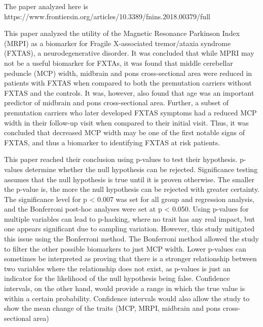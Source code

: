 \documentclass[./ProjectReport.tex]{subfiles}
\begin{document}
\begin{center}
    The paper analyzed here is https://www.frontiersin.org/articles/10.3389/fnins.2018.00379/full    
\end{center}

This paper analyzed the utility of the Magnetic Resonance Parkinson Index (MRPI) as a biomarker 
for Fragile X-associated tremor/ataxia syndrome (FXTAS), a neurodegenerative disorder. It was 
concluded that while MPRI may not be a useful biomarker for FXTAs, it was found that middle 
cerebellar peduncle (MCP) width, midbrain and pons cross-sectional area were reduced in patients 
with FXTAS when compared to both the premutation carriers without FXTAS and the controls. It was, 
however, also found that age was an important predictor of midbrain and pons cross-sectional area. 
Further, a subset of premutation carriers who later developed FXTAS symptoms had a reduced MCP width 
in their follow-up visit when compared to their initial visit. Thus, it was concluded that decreased 
MCP width may be one of the first notable signs of FXTAS, and thus a biomarker to identifying FXTAS 
at risk patients. 

This paper reached their conclusion using p-values to test their 
hypothesis. p-values determine whether the null hypothesis can be rejected. Significance testing 
assumes that the null hypothesis is true until it is proven otherwise. The smaller the p-value is, 
the more the null hypothesis can be rejected with greater certainty. The significance level for p < 
0.007 was set for all group and regression analysis, and the Bonferroni post-hoc analyses were set at 
p < 0.050. Using p-values for multiple variables can lead to p-hacking, where no trait has any real impact, 
but one appears significant due to sampling variation. However, this study mitigated this issue using the 
Bonferroni method. The Bonferroni method allowed the study to filter the other possible biomarkers to just 
MCP width. Lower p-values can sometimes be interpreted as proving that there is a stronger relationship 
between two variables where the relationship does not exist, as p-values is just an indicator for the likelihood 
of the null hypothesis being false. Confidence intervals, on the other hand, would provide a range in which 
the true value is within a certain probability. Confidence intervals would also allow the study to show the mean 
change of the traits (MCP, MRPI, midbrain and pons cross-sectional area)
\end{document}
